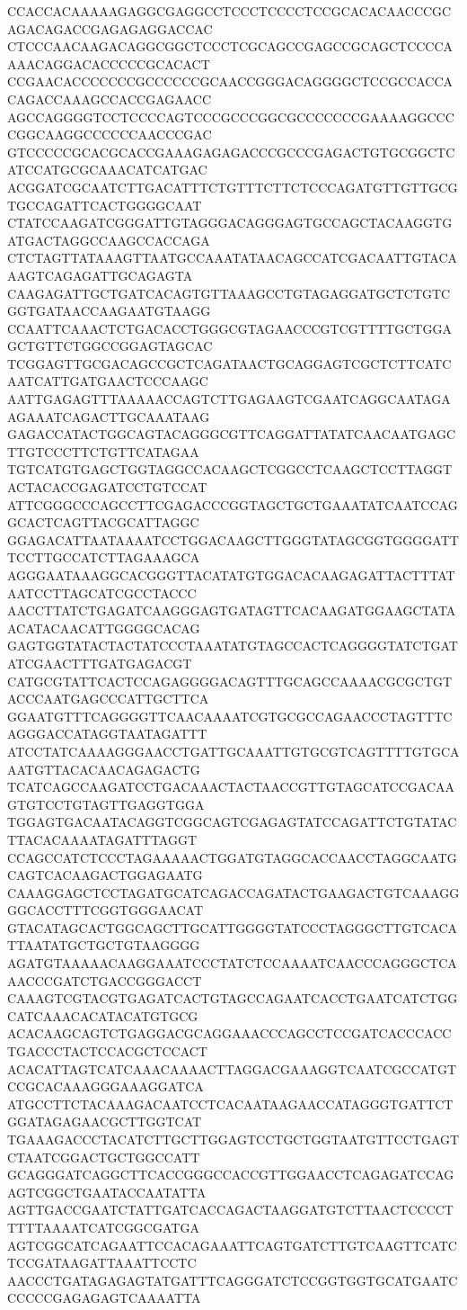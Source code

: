 CCACCACAAAAAGAGGCGAGGCCTCCCTCCCCTCCGCACACAACCCGCAGACAGACCGAGAGAGGACCAC
CTCCCAACAAGACAGGCGGCTCCCTCGCAGCCGAGCCGCAGCTCCCCAAAACAGGACACCCCCGCACACT
CCGAACACCCCCCCGCCCCCCGCAACCGGGACAGGGGCTCCGCCACCACAGACCAAAGCCACCGAGAACC
AGCCAGGGGTCCTCCCCAGTCCCGCCCGGCGCCCCCCCGAAAAGGCCCCGGCAAGGCCCCCCAACCCGAC
GTCCCCCGCACGCACCGAAAGAGAGACCCGCCCGAGACTGTGCGGCTCATCCATGCGCAAACATCATGAC
ACGGATCGCAATCTTGACATTTCTGTTTCTTCTCCCAGATGTTGTTGCGTGCCAGATTCACTGGGGCAAT
CTATCCAAGATCGGGATTGTAGGGACAGGGAGTGCCAGCTACAAGGTGATGACTAGGCCAAGCCACCAGA
CTCTAGTTATAAAGTTAATGCCAAATATAACAGCCATCGACAATTGTACAAAGTCAGAGATTGCAGAGTA
CAAGAGATTGCTGATCACAGTGTTAAAGCCTGTAGAGGATGCTCTGTCGGTGATAACCAAGAATGTAAGG
CCAATTCAAACTCTGACACCTGGGCGTAGAACCCGTCGTTTTGCTGGAGCTGTTCTGGCCGGAGTAGCAC
TCGGAGTTGCGACAGCCGCTCAGATAACTGCAGGAGTCGCTCTTCATCAATCATTGATGAACTCCCAAGC
AATTGAGAGTTTAAAAACCAGTCTTGAGAAGTCGAATCAGGCAATAGAAGAAATCAGACTTGCAAATAAG
GAGACCATACTGGCAGTACAGGGCGTTCAGGATTATATCAACAATGAGCTTGTCCCTTCTGTTCATAGAA
TGTCATGTGAGCTGGTAGGCCACAAGCTCGGCCTCAAGCTCCTTAGGTACTACACCGAGATCCTGTCCAT
ATTCGGGCCCAGCCTTCGAGACCCGGTAGCTGCTGAAATATCAATCCAGGCACTCAGTTACGCATTAGGC
GGAGACATTAATAAAATCCTGGACAAGCTTGGGTATAGCGGTGGGGATTTCCTTGCCATCTTAGAAAGCA
AGGGAATAAAGGCACGGGTTACATATGTGGACACAAGAGATTACTTTATAATCCTTAGCATCGCCTACCC
AACCTTATCTGAGATCAAGGGAGTGATAGTTCACAAGATGGAAGCTATAACATACAACATTGGGGCACAG
GAGTGGTATACTACTATCCCTAAATATGTAGCCACTCAGGGGTATCTGATATCGAACTTTGATGAGACGT
CATGCGTATTCACTCCAGAGGGGACAGTTTGCAGCCAAAACGCGCTGTACCCAATGAGCCCATTGCTTCA
GGAATGTTTCAGGGGTTCAACAAAATCGTGCGCCAGAACCCTAGTTTCAGGGACCATAGGTAATAGATTT
ATCCTATCAAAAGGGAACCTGATTGCAAATTGTGCGTCAGTTTTGTGCAAATGTTACACAACAGAGACTG
TCATCAGCCAAGATCCTGACAAACTACTAACCGTTGTAGCATCCGACAAGTGTCCTGTAGTTGAGGTGGA
TGGAGTGACAATACAGGTCGGCAGTCGAGAGTATCCAGATTCTGTATACTTACACAAAATAGATTTAGGT
CCAGCCATCTCCCTAGAAAAACTGGATGTAGGCACCAACCTAGGCAATGCAGTCACAAGACTGGAGAATG
CAAAGGAGCTCCTAGATGCATCAGACCAGATACTGAAGACTGTCAAAGGGGCACCTTTCGGTGGGAACAT
GTACATAGCACTGGCAGCTTGCATTGGGGTATCCCTAGGGCTTGTCACATTAATATGCTGCTGTAAGGGG
AGATGTAAAAACAAGGAAATCCCTATCTCCAAAATCAACCCAGGGCTCAAACCCGATCTGACCGGGACCT
CAAAGTCGTACGTGAGATCACTGTAGCCAGAATCACCTGAATCATCTGGCATCAAACACATACATGTGCG
ACACAAGCAGTCTGAGGACGCAGGAAACCCAGCCTCCGATCACCCACCTGACCCTACTCCACGCTCCACT
ACACATTAGTCATCAAACAAAACTTAGGACGAAAGGTCAATCGCCATGTCCGCACAAAGGGAAAGGATCA
ATGCCTTCTACAAAGACAATCCTCACAATAAGAACCATAGGGTGATTCTGGATAGAGAACGCTTGGTCAT
TGAAAGACCCTACATCTTGCTTGGAGTCCTGCTGGTAATGTTCCTGAGTCTAATCGGACTGCTGGCCATT
GCAGGGATCAGGCTTCACCGGGCCACCGTTGGAACCTCAGAGATCCAGAGTCGGCTGAATACCAATATTA
AGTTGACCGAATCTATTGATCACCAGACTAAGGATGTCTTAACTCCCCTTTTTAAAATCATCGGCGATGA
AGTCGGCATCAGAATTCCACAGAAATTCAGTGATCTTGTCAAGTTCATCTCCGATAAGATTAAATTCCTC
AACCCTGATAGAGAGTATGATTTCAGGGATCTCCGGTGGTGCATGAATCCCCCCGAGAGAGTCAAAATTA
